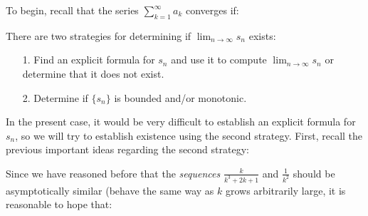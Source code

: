\documentclass{ximera}
\begin{document}
\begin{exercise}
\begin{exercise}
To begin, recall that the series $\sum_{k=1}^{\infty}  a_k$ converges if:

\begin{multipleChoice}
\end{multipleChoice}

There are two strategies for determining if $\lim_{n \to \infty} s_n$ exists:

\begin{itemize}
\item[1.] Find an explicit formula for $s_n$ and use it to compute $\lim_{n \to \infty} s_n$ or determine that it does not exist.
\item[2.] Determine if $\{s_n\}$ is bounded and/or monotonic.   
\end{itemize}

In the present case, it would be very difficult to establish an explicit formula for $s_n$, so we will try to establish existence using the second strategy.  First, recall the previous important ideas regarding the second strategy:

\begin{selectAll}
\end{selectAll}

Since we have reasoned before that the \emph{sequences} $\frac{k}{k^3+2k+1}$ and $\frac{1}{k^2}$ should be asymptotically similar (behave the same way as $k$ grows arbitrarily large, it is reasonable to hope that:

\begin{multipleChoice}
\end{multipleChoice}


\end{exercise}
\end{exercise}
\end{document}
